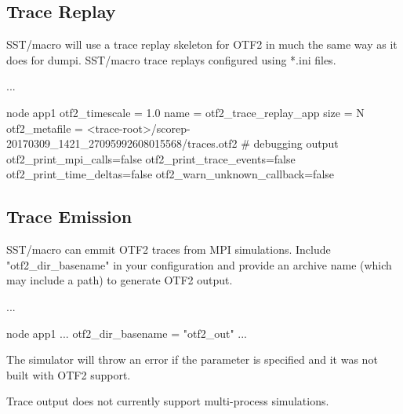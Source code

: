 \subsection{Trace Replay}
\label{subsec:otf:traceReplay}
SST/macro will use a trace replay skeleton for OTF2 in much the same way as it does for dumpi. SST/macro trace replays configured using *.ini files. 

\begin{ViFile}
...

node {
 app1 {
  otf2_timescale = 1.0
  name = otf2_trace_replay_app
  size = N
  otf2_metafile = <trace-root>/scorep-20170309_1421_27095992608015568/traces.otf2
 # debugging output
  otf2_print_mpi_calls=false
  otf2_print_trace_events=false
  otf2_print_time_deltas=false
  otf2_warn_unknown_callback=false
 }
}

\end{ViFile}

\subsection{Trace Emission}
\label{subsec:otf:traceEmission}
SST/macro can emmit OTF2 traces from MPI simulations.
Include "otf2\_dir\_basename" in your configuration and provide an archive name (which may include a path) to generate OTF2 output.

\begin{ViFile}
...

node {
 app1 {
  ...
  otf2\_dir\_basename = "otf2\_out"
  ...
 }
}

\end{ViFile}

The simulator will throw an error if the parameter is specified and it was not built with OTF2 support.

Trace output does not currently support multi-process simulations.
